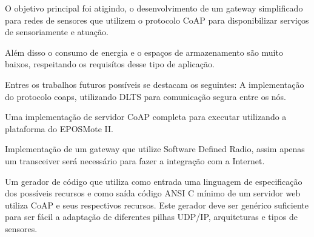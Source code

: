 O objetivo principal foi atigindo, o desenvolvimento de um gateway simplificado para redes de sensores que utilizem o protocolo CoAP para disponibilizar servi\c{c}os de sensoriamente e atua\c{c}\~ao.

Al\'em disso o consumo de energia e o espa\c{c}os de armazenamento s\~ao muito baixos, respeitando os requis\'itos desse tipo de aplica\c{c}\~ao.

Entres os trabalhos futuros poss\'iveis se destacam os seguintes:
A implementa\c{c}\~ao do protocolo coaps, utilizando DLTS para comunica\c{c}\~ao segura entre os n\'os.

Uma implementa\c{c}\~ao de servidor CoAP completa para executar utilizando a plataforma do EPOSMote II.

Implementa\c{c}\~ao de um gateway que utilize Software Defined Radio, assim apenas um transceiver ser\'a necess\'ario para
fazer a integra\c{c}\~ao com a Internet.

Um gerador de c\'odigo que utiliza como entrada uma linguagem de especifica\c{c}\~ao dos poss\'iveis recursos e como sa\'ida c\'odigo ANSI C m\'inimo de um servidor web utiliza CoAP e seus respectivos recursos. Este gerador deve ser gen\'erico suficiente para ser f\'acil a adapta\c{c}\~ao de diferentes pilhas UDP/IP, arquiteturas e tipos de sensores.
